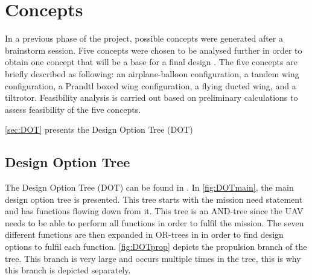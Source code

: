 \chapter{Concepts}
\label{ch:concepts}

In a previous phase of the project, possible concepts were generated after a brainstorm session. Five concepts were chosen to be analysed further in order to obtain one concept that will be a base for a final design \cite{baseline}. The five concepts are briefly described as following:  an airplane-balloon configuration, a tandem wing configuration, a Prandtl boxed wing configuration, a flying ducted wing, and a tiltrotor. Feasibility analysis is carried out based on preliminary calculations to assess feasibility of the five concepts.

\autoref{sec:DOT} presents the Design Option Tree (DOT) 


\section{Design Option Tree}
\label{sec:DOT}

The Design Option Tree (DOT) can be found in . In \autoref{fig:DOTmain}, the main design option tree is presented. This tree starts with the mission need statement and has functions flowing down from it. This tree is an AND-tree since the UAV needs to be able to perform all functions in order to fulfil the mission. The seven different functions are then expanded in OR-trees in  in order to find design options to fulfil each function. \autoref{fig:DOTprop} depicts the propulsion branch of the tree. This branch is very large and occurs multiple times in the tree, this is why this branch is depicted separately.


